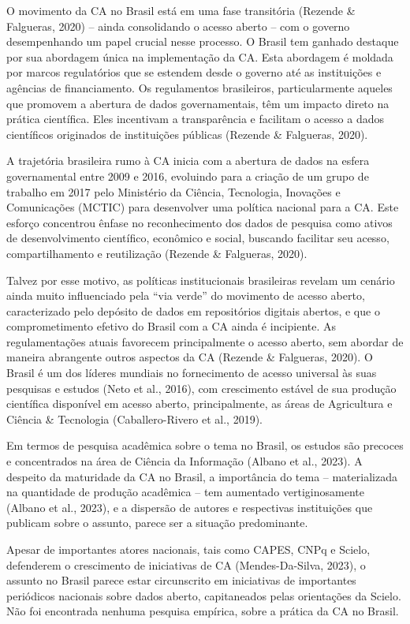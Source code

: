 \documentclass[
  a4paper,
]{article}
\begin{document}
O movimento da CA no Brasil está em uma fase transitória (Rezende \&
Falgueras, 2020) -- ainda consolidando o acesso aberto -- com o governo
desempenhando um papel crucial nesse processo. O Brasil tem ganhado
destaque por sua abordagem única na implementação da CA. Esta abordagem
é moldada por marcos regulatórios que se estendem desde o governo até as
instituições e agências de financiamento. Os regulamentos brasileiros,
particularmente aqueles que promovem a abertura de dados governamentais,
têm um impacto direto na prática científica. Eles incentivam a
transparência e facilitam o acesso a dados científicos originados de
instituições públicas (Rezende \& Falgueras, 2020).

A trajetória brasileira rumo à CA inicia com a abertura de dados na
esfera governamental entre 2009 e 2016, evoluindo para a criação de um
grupo de trabalho em 2017 pelo Ministério da Ciência, Tecnologia,
Inovações e Comunicações (MCTIC) para desenvolver uma política nacional
para a CA. Este esforço concentrou ênfase no reconhecimento dos dados de
pesquisa como ativos de desenvolvimento científico, econômico e social,
buscando facilitar seu acesso, compartilhamento e reutilização (Rezende
\& Falgueras, 2020).

Talvez por esse motivo, as políticas institucionais brasileiras revelam
um cenário ainda muito influenciado pela ``via verde'' do movimento de
acesso aberto, caracterizado pelo depósito de dados em repositórios
digitais abertos, e que o comprometimento efetivo do Brasil com a CA
ainda é incipiente. As regulamentações atuais favorecem principalmente o
acesso aberto, sem abordar de maneira abrangente outros aspectos da CA
(Rezende \& Falgueras, 2020). O Brasil é um dos líderes mundiais no
fornecimento de acesso universal às suas pesquisas e estudos (Neto et
al., 2016), com crescimento estável de sua produção científica
disponível em acesso aberto, principalmente, as áreas de Agricultura e
Ciência \& Tecnologia (Caballero-Rivero et al., 2019).

Em termos de pesquisa acadêmica sobre o tema no Brasil, os estudos são
precoces e concentrados na área de Ciência da Informação (Albano et al.,
2023). A despeito da maturidade da CA no Brasil, a importância do tema
-- materializada na quantidade de produção acadêmica -- tem aumentado
vertiginosamente (Albano et al., 2023), e a dispersão de autores e
respectivas instituições que publicam sobre o assunto, parece ser a
situação predominante.

Apesar de importantes atores nacionais, tais como CAPES, CNPq e Scielo,
defenderem o crescimento de iniciativas de CA (Mendes-Da-Silva, 2023), o
assunto no Brasil parece estar circunscrito em iniciativas de
importantes periódicos nacionais sobre dados aberto, capitaneados pelas
orientações da Scielo. Não foi encontrada nenhuma pesquisa empírica,
sobre a prática da CA no Brasil.
\end{document}

